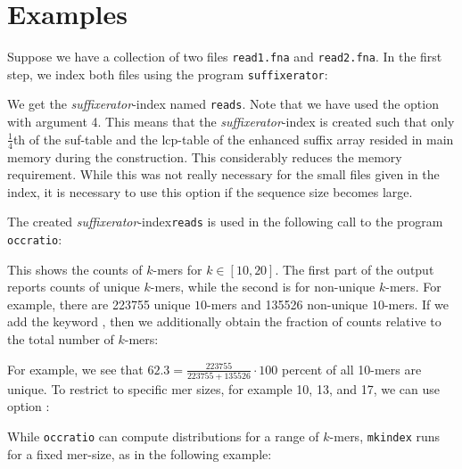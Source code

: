 \documentclass[12pt]{article}
\newcommand{\Programname}[1]{\texttt{\small #1}}
\newcommand{\TYmkindex}[0]{\Programname{mkindex}\xspace}
\newcommand{\TYoccratio}[0]{\Programname{occratio}\xspace}
\newcommand{\SFX}[0]{\Programname{suffixerator}\xspace}
\newcommand{\SFXidx}[0]{\textit{suffixerator}-index\xspace}
\begin{document}
\section{Examples}\label{Examples}

Suppose we have a collection of two files \texttt{read1.fna} and
\texttt{read2.fna}. In the first step, we index
both files using the program \SFX:


We get the \SFXidx named \texttt{reads}. Note that we have
used the option  with argument 4. This means that
the \SFXidx is created such that only $\frac{1}{4}$th of the
\textsf{suf}-table and the \textsf{lcp}-table of the enhanced suffix array
resided in main memory during the construction. This considerably reduces
the memory requirement.
While this was not really necessary for the small files given in the
index, it is necessary to use this option if the sequence size becomes large.

The created \SFXidx \texttt{reads}
is used in the following call to the program \TYoccratio:


This shows the counts of $k$-mers for $k\in[10,20]$. The first part of the
output reports counts of unique $k$-mers, while the second is for
non-unique $k$-mers. For example, there are 223755 unique $10$-mers
and 135526 non-unique $10$-mers. If we add the keyword
, then we additionally obtain the fraction
of counts relative to the total number of $k$-mers:


For example, we see that $62.3=\frac{223755}{223755+135526}\cdot 100$
percent of all 10-mers are unique. To restrict to specific mer sizes, for
example 10, 13, and 17, we can use option :


While \TYoccratio can compute distributions for a range of
$k$-mers, \TYmkindex runs for a fixed mer-size, as in the following example:

\end{document}
